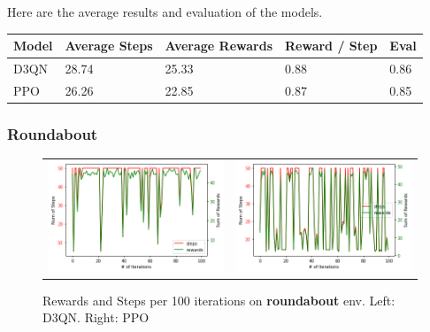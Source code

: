 \documentclass[leqno]{article}
\begin{document}
\begin{multicols}{2}
Here are the average results and evaluation of the models.\\

\begin{tabular}{ |p{1cm}||p{1.5cm}|p{1.5cm}|p{1.2cm}|p{0.8cm}|  }
 \hline
 Model&Average Steps& Average Rewards& Reward / Step&Eval\\
 \hline
 D3QN & 28.74 & 25.33 & 0.88 & 0.86\\
 PPO & 26.26 & 22.85 &  0.87 & 0.85\\
 \hline
\end{tabular}

\subsubsection{Roundabout}

\begin{figure}[H]
  \begin{tabular}{ll}
    \includegraphics[scale=0.25]{figs/d3qn_ex3_roundabout.png}&
    \includegraphics[scale=0.25]{figs/ppo_ex3_roundabout.png}\\
  \end{tabular}
  \caption{Rewards and Steps per 100 iterations on \textbf{roundabout} env. Left: D3QN. Right: PPO}
  \label{hyperparams}
\end{figure}


\end{multicols}
\end{document}
